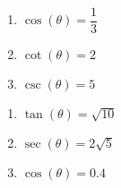 \begin{multicols}{3}

\begin{enumerate}

\setcounter{enumi}{\value{HW}}


\item  $\cos(\theta) = \dfrac{1}{3}$ 

\item  $\cot(\theta) = 2$ 

\item  $\csc(\theta) = 5$ 

\setcounter{HW}{\value{enumi}}

\end{enumerate}

\end{multicols}

\begin{multicols}{3}

\begin{enumerate}

\setcounter{enumi}{\value{HW}}

\item  $\tan(\theta) = \sqrt{10}$ 
\item  $\sec(\theta) = 2\sqrt{5}$ 
\item  $\cos(\theta) = 0.4$    \label{findothercirclastapprighttrig}

\setcounter{HW}{\value{enumi}}

\end{enumerate}

\end{multicols}


